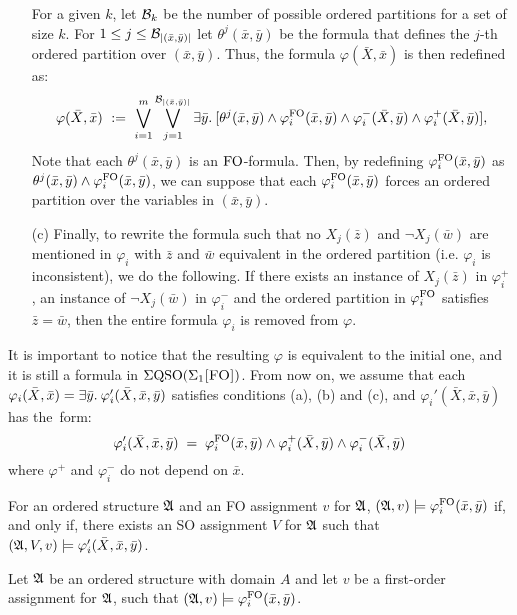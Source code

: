 \begin{itemize}
	For a given $k$, let $\mathcal{B}_k$ be the number of possible ordered partitions for a set of size $k$. For $1 \leq j \leq \mathcal{B}_{\vert (\bar{x},\bar{y}) \vert}$ 
	let $\theta^j(\bar{x},\bar{y})$ be the formula that defines the $j$-th ordered partition over $(\bar{x},\bar{y})$. 
	Thus, the formula $\varphi(\bar{X},\bar{x})$ is then redefined as:
	$$
	\varphi(\bar{X},\bar{x}) \ := \ \bigvee_{i = 1}^m \bigvee_{j = 1}^{\mathcal{B}_{\vert (\bar{x},\bar{y}) \vert}} \exists{\bar{y}}.\: [\theta^j(\bar{x},\bar{y})\wedge \varphi_i^{{\rm FO}}(\bar{x},\bar{y}) \wedge \varphi_i^{-}(\bar{X},\bar{y}) \wedge \varphi_i^{+}(\bar{X},\bar{y})],
	$$
	Note that each $\theta^j(\bar{x},\bar{y})$ is an ${\rm FO}$-formula.
	Then, by redefining $\varphi_i^{{\rm FO}}(\bar{x},\bar{y})$  as $\theta^j(\bar{x},\bar{y})\wedge \varphi_i^{{\rm FO}}(\bar{x},\bar{y})$, we can suppose that each $\varphi_i^{{\rm FO}}(\bar{x},\bar{y})$ forces an ordered partition over the variables in $(\bar{x},\bar{y})$.
	\item[(c)] Finally, to rewrite the formula such that no $X_j(\bar{z})$ and $\neg X_j(\bar{w})$ are mentioned in $\varphi_i$ with $\bar{z}$ and $\bar{w}$ equivalent in the ordered partition (i.e. $\varphi_i$ is inconsistent), we do the following. If there exists an instance of $X_j(\bar{z})$ in $\varphi^{+}_i$, an instance of $\neg X_j(\bar{w})$ in $\varphi^{-}_i$ and the ordered partition in $\varphi^{{\rm FO}}_i$ satisfies $\bar{z} = \bar{w}$, then the entire formula $\varphi_i$ is removed from $\varphi$.
\end{itemize}
It is important to notice that the resulting $\varphi$ is equivalent to the initial one, and it is still a formula in $\Sigma{\rm QSO}(\Sigma_{1}\textsc{[FO]})$. From now on, we assume that each $\varphi_i(\bar{X},\bar{x}) = \exists{\bar{y}}.\:  \varphi_i'(\bar{X},\bar{x}, \bar{y}) $ satisfies conditions (a), (b) and (c), and $\varphi_i'(\bar{X},\bar{x}, \bar{y})$ has the~form:
$$
\varphi_i'(\bar{X},\bar{x}, \bar{y}) \; = \; \varphi^{{\rm FO}}_i(\bar{x},\bar{y}) \wedge \varphi^{+}_i(\bar{X}, \bar{y}) \wedge \varphi^{-}_i(\bar{X},\bar{y}) 
$$
where $\varphi^{+}$ and $\varphi^{-}_i$ do not depend on  $\bar{x}$.
\begin{clm}\label{claim:minusone}
	For an ordered structure $\mathfrak{A}$ and an FO assignment $v$ for $\mathfrak{A}$, $(\mathfrak{A},v)\models\varphi^{{\rm FO}}_i(\bar{x},\bar{y})$ if, and only if, there exists an SO assignment $V$ for $\mathfrak{A}$ such that $(\mathfrak{A},V,v)\models \varphi_i'(\bar{X},\bar{x}, \bar{y})$.
\end{clm}
\proof
	Let $\mathfrak{A}$ be an ordered structure with domain $A$ and let $v$ be a first-order assignment for $\mathfrak{A}$, such that $(\mathfrak{A},v)\models\varphi^{{\rm FO}}_i(\bar{x},\bar{y})$.
